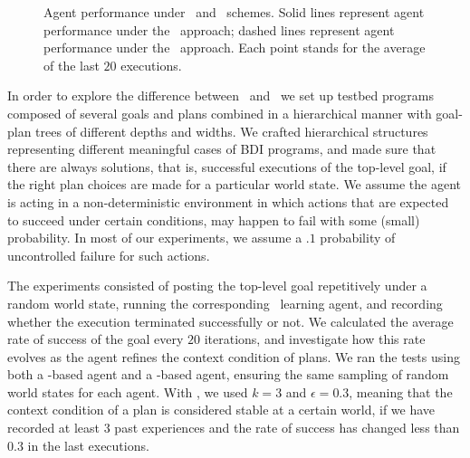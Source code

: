 \begin{figure*}[t]
\begin{center}
{
}
\caption{Agent performance under \BUL\ and \CL\ schemes. Solid lines
represent agent performance under the \BUL\ approach; dashed lines represent agent performance under
the \CL\ approach. Each point stands for the average of the last $20$ executions.}
\end{center}
\end{figure*}

In order to explore the difference between \BUL\ and \CL\ we 
set up testbed programs composed of several goals and plans combined
in a hierarchical manner with goal-plan trees of different depths and
widths. We crafted hierarchical structures representing
different meaningful cases of BDI programs, and made sure that there
are always solutions, that is, successful executions of the top-level
goal, if the right plan choices are made for a particular world state. 
%
%
We assume the agent is acting in a non-deterministic environment in
which actions that are expected to succeed under certain conditions,
may happen to fail with some (small) probability. In most of our
experiments, we assume a $.1$ probability of uncontrolled failure for
such actions. 

The experiments consisted of posting the top-level goal repetitively
under a random world state, running the corresponding \JACK\ learning
agent, and recording whether the execution terminated successfully or
not. We calculated the average rate of success of the goal every  $20$
iterations, and investigate how this rate evolves as the agent refines
the context condition of plans. 
%
We ran the tests using both a \BUL-based agent and a \CL-based
agent, ensuring the same sampling of random world states for each
agent. 
%
With \BUL, we used $k=3$ and $\epsilon=0.3$, meaning that
the context condition of a plan is considered stable at a certain
world, if we have recorded at least $3$ past experiences and the rate
of success has changed less than $0.3$ in the last executions.
%


